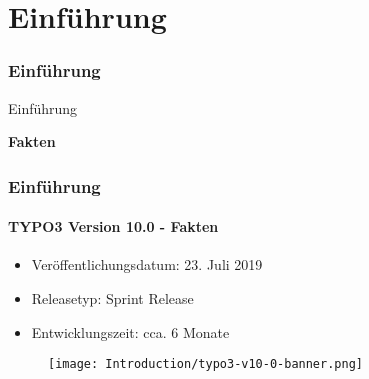 %

\section{Einführung}
\begin{frame}[fragile]
	\frametitle{Einführung}

	\begin{center}\huge{Einführung}\end{center}
	\begin{center}\huge{\color{typo3darkgrey}\textbf{Fakten}}\end{center}

\end{frame}


\begin{frame}[fragile]
	\frametitle{Einführung}
	\framesubtitle{TYPO3 Version 10.0 - Fakten}

	\begin{itemize}
		\item Veröffentlichungsdatum: 23. Juli 2019
		\item Releasetyp: Sprint Release
		\item Entwicklungszeit: cca. 6 Monate
	\end{itemize}

	\begin{figure}
		\texttt{[image: Introduction/typo3-v10-0-banner.png]}
	\end{figure}

\end{frame}


